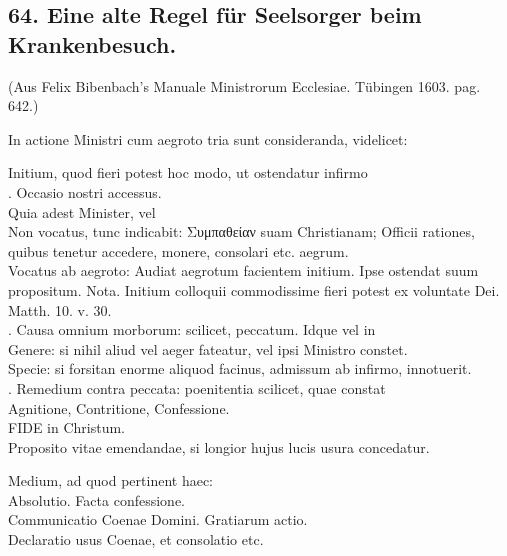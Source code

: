\subsection*{64. Eine alte Regel für Seelsorger beim Krankenbesuch.}

(Aus Felix Bibenbach’s Manuale Ministrorum Ecclesiae. Tübingen 1603. pag. 642.)

In actione Ministri cum aegroto tria sunt consideranda, videlicet:

Initium, quod fieri potest hoc modo, ut ostendatur infirmo\\
. Occasio nostri accessus.\\
\quad\quad Quia adest Minister, vel\\
\quad\quad\quad Non vocatus, tunc indicabit: Συμπαθείαν suam Christianam; Officii rationes, quibus tenetur accedere, monere, consolari etc. aegrum.\\
\quad\quad\quad Vocatus ab aegroto: Audiat aegrotum facientem initium. Ipse ostendat suum propositum. Nota. Initium colloquii commodissime fieri potest ex voluntate Dei. Matth. 10. v. 30.\\
. Causa omnium morborum: scilicet, peccatum. Idque vel in\\
\quad\quad Genere: si nihil aliud vel aeger fateatur, vel ipsi Ministro constet.\\
\quad\quad Specie: si forsitan enorme aliquod facinus, admissum ab infirmo, innotuerit.\\
. Remedium contra peccata: poenitentia scilicet, quae constat\\
\quad\quad Agnitione, Contritione, Confessione.\\
\quad\quad FIDE in Christum.\\
\quad\quad Proposito vitae emendandae, si longior hujus lucis usura concedatur.

Medium, ad quod pertinent haec:\\
\quad Absolutio. Facta confessione.\\
\quad Communicatio Coenae Domini. Gratiarum actio.\\
\quad Declaratio usus Coenae, et consolatio etc.

